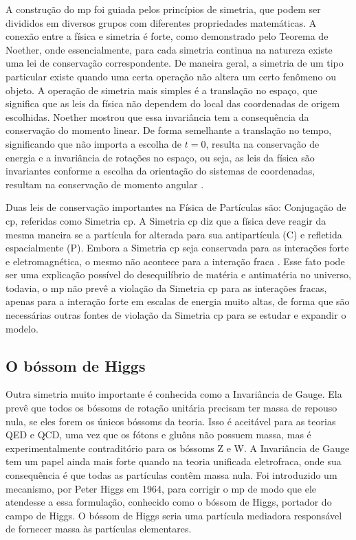 A construção do \gls{mp} foi guiada pelos princípios 
de simetria, que podem ser divididos em diversos grupos com diferentes
propriedades matemáticas. A conexão entre a física e simetria é forte, como
demonstrado pelo Teorema de Noether, onde essencialmente, para cada simetria
continua na natureza existe uma lei de conservação correspondente. De maneira
geral, a simetria de um tipo particular existe quando uma certa operação não
altera um certo fenômeno ou objeto. A operação de simetria mais simples é a
translação no espaço, que significa que as leis da física não dependem do local
das coordenadas de origem escolhidas. Noether mostrou que essa invariância tem a
consequência da conservação do momento linear. De forma semelhante a translação
no tempo, significando que não importa a escolha de $t = 0$, resulta na
conservação de energia e a invariância de rotações no espaço, ou seja, as leis
da física são invariantes conforme a escolha da orientação do sistemas de
coordenadas, resultam na conservação de momento angular
\cite{Intro_Standard,Feynman}.


Duas leis de conservação importantes na Física de
Partículas são: Conjugação de \gls{cp}, referidas como Simetria \gls{cp}. 
A Simetria \gls{cp} diz que a física deve reagir
da mesma maneira se a partícula for alterada para sua antipartícula (C) e refletida
espacialmente (P).
Embora a Simetria \gls{cp} seja conservada para as interações forte
e eletromagnética, o mesmo não acontece para a interação fraca
\cite{Intro_Nuclear}. Esse fato pode ser uma explicação possível do
desequilíbrio de matéria e antimatéria no universo, todavia, o \gls{mp} não
prevê a violação da Simetria \gls{cp} para as interações fracas, apenas para a
interação forte em escalas de energia muito altas, de forma que são necessárias
outras fontes de violação da Simetria \gls{cp} para se estudar e expandir o modelo.
 
\subsection{O bóssom de Higgs}
\label{ssec:higgs}

Outra simetria muito importante é conhecida como a Invariância de Gauge.
Ela prevê que todos os bóssoms de rotação unitária precisam ter
massa de repouso nula, se eles forem os únicos bóssoms da teoria.
Isso é aceitável para as teorias QED e QCD, uma vez que os
fótons e gluôns não possuem massa, mas é experimentalmente contraditório
para os bóssoms Z e W. A Invariância de Gauge tem um papel ainda mais forte
quando na teoria unificada eletrofraca, onde sua consequência é que todas as
partículas contêm massa nula. Foi introduzido um mecanismo, 
por Peter Higgs em 1964, para corrigir o \gls{mp} de modo que ele atendesse
a essa formulação, conhecido como o bóssom de Higgs, portador do campo de Higgs. O bóssom de Higgs seria
uma partícula mediadora responsável de fornecer massa às partículas elementares.

